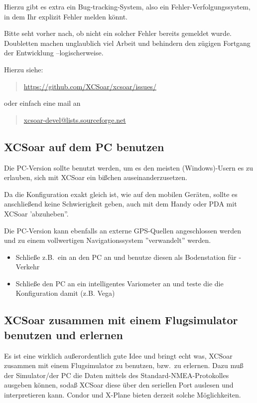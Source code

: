 Hierzu gibt es extra ein Bug-tracking-System, also ein Fehler-Verfolgungssystem, in dem Ihr explizit Fehler melden könnt.

Bitte seht vorher nach, ob nicht ein solcher Fehler bereits gemeldet wurde. 
Doubletten machen unglaublich viel Arbeit und behindern den zügigen Fortgang der Entwicklung --logischerweise.  


Hierzu siehe:  
\begin{quote}
\url{https://github.com/XCSoar/xcsoar/issues/}
\end{quote}
oder einfach eine mail an 
\begin{quote}
\url{xcsoar-devel@lists.sourceforge.net}
\end{quote} 

\subsection*{\textsf{XCSoar} auf dem PC benutzen}
Die PC-Version sollte benutzt werden, um es den meisten (Windows)-Usern es zu erlauben, sich mit \textsf{XCSoar} ein 
bißchen auseinanderzusetzen. 

Da die Konfiguration exakt gleich ist, wie auf den mobilen Geräten, sollte es anschließend keine Schwierigkeit geben,
auch mit dem Handy oder PDA mit \textsf{XCSoar} 'abzuheben''.


Die PC-Version kann ebenfalls an externe GPS-Quellen angeschlossen werden und zu einem 
vollwertigen Navigationssystem ''verwandelt'' werden. 


\begin{itemize}
\item Schließe z.B.\ ein \fl an den PC an und benutze diesen als Bodenstation für \fl-Verkehr
\item Schließe den PC an ein intelligentes Variometer an und teste die die Konfiguration damit  (z.B. Vega)
\end{itemize}

\subsection*{\textsf{XCSoar} zusammen mit einem Flugsimulator benutzen und erlernen}
Es ist eine wirklich außerordentlich gute Idee und bringt echt was, \textsf{XCSoar} zusammen mit einem Flugsimulator zu benutzen, bzw.\ zu erlernen.
Dazu muß der Simulator/der PC die Daten mittels des Standard-NMEA-Protokolles ausgeben können, sodaß  \textsf{XCSoar} diese über den seriellen Port auslesen und interpretieren kann.
{\sc Condor} und {\sc X-Plane} bieten derzeit solche Möglichkeiten.  

